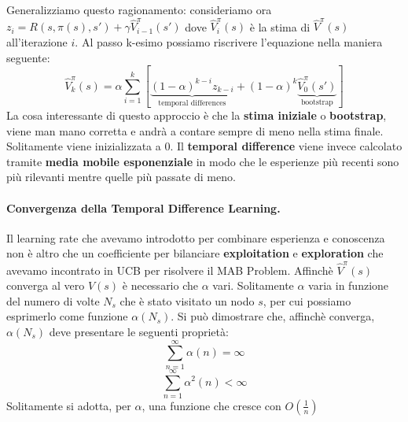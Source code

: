 Generalizziamo questo ragionamento: consideriamo ora $z_i = R(s,\pi(s),s') + \gamma \widehat{V}_{i - 1}^{\pi}(s')$ dove
$\widehat{V}_{i}^{\pi}(s)$ è la stima di $\widehat{V}^{\pi}(s)$ all'iterazione $i$. Al passo k-esimo possiamo riscrivere
l'equazione nella maniera seguente:
\begin{equation}
    \widehat{V}_k^{\pi}(s) = \alpha\sum_{i = 1}^{k} \left[\underbrace{(1- \alpha)^{k - i}z_{k - i}}_{\text{temporal differences}}+ (1 - \alpha)^k \underbrace{\widehat{V}_0^{\pi}(s')}_{\text{bootstrap}}\right]
\end{equation}
La cosa interessante di questo approccio è che la \textbf{stima iniziale} o \textbf{bootstrap}, viene man mano corretta e andrà a contare sempre di meno nella stima finale.
Solitamente viene inizializzata a 0. Il \textbf{temporal difference} viene invece calcolato tramite \textbf{media mobile esponenziale} in modo che 
le esperienze più recenti sono più rilevanti mentre quelle più passate di meno.

\paragraph{Convergenza della Temporal Difference Learning.}
Il learning rate che avevamo introdotto per combinare esperienza e conoscenza non è altro che un coefficiente per bilanciare
\textbf{exploitation} e \textbf{exploration} che avevamo incontrato in UCB per risolvere il MAB Problem. Affinchè $\widehat{V}^{\pi}(s)$ 
converga al vero $V(s)$ è necessario che $\alpha$ vari. Solitamente $\alpha $ varia in funzione del numero di volte $N_s$ che è
stato visitato un nodo $s$, per cui possiamo esprimerlo come funzione $\alpha(N_s)$. Si può dimostrare che, affinchè converga,
$\alpha(N_s)$ deve presentare le seguenti proprietà:
\begin{equation}
    \sum_{n = 1}^{\infty} \alpha(n) = \infty
\end{equation}
 \begin{equation}
    \sum_{n = 1}^{\infty} \alpha^2(n) < \infty
\end{equation}
Solitamente si adotta, per $\alpha$, una funzione che cresce con $O(\frac{1}{n})$
